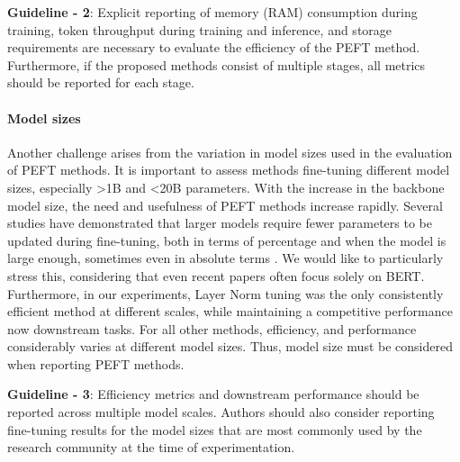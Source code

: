\begin{tcolorbox}[
    colback=gray!05,  
    colframe=black!50, boxrule=0.5pt, arc=3mm,           
    width=\linewidth,  
    leftrule=0.1mm, rightrule=0.1mm, bottomrule=0.1mm, toprule=0.1mm, ]
\textbf{Guideline - 2}: Explicit reporting of memory (RAM) consumption during training, token throughput during training and inference, and storage requirements are necessary to evaluate the efficiency of the PEFT method. Furthermore, if the proposed methods consist of multiple stages, all metrics should be reported for each stage. 
\end{tcolorbox}

\paragraph{Model sizes} Another challenge arises from the variation in model sizes used in the evaluation of PEFT methods. It is important to assess methods fine-tuning different model sizes, especially \textgreater1B and \textless20B parameters. With the increase in the backbone model size, the need and usefulness of PEFT methods increase rapidly. Several studies \citep{intrinsic_said,lora} have demonstrated that larger models require fewer parameters to be updated during fine-tuning, both in terms of percentage and when the model is large enough, sometimes even in absolute terms \citep{prefix_tuning}. We would like to particularly stress this, considering that even recent papers often focus solely on BERT. Furthermore, in our experiments, Layer Norm tuning \citep{layer_norm_tuning} was the only consistently efficient method at different scales, while maintaining a competitive performance now downstream tasks. For all other methods, efficiency, and performance considerably varies at different model sizes. Thus, model size must be considered when reporting PEFT methods.

\begin{tcolorbox}[
    colback=gray!05,  
    colframe=black!50, boxrule=0.5pt, arc=3mm,           
    width=\linewidth,  
    leftrule=0.1mm, rightrule=0.1mm, bottomrule=0.1mm, toprule=0.1mm, ]
\textbf{Guideline - 3}: Efficiency metrics and downstream performance should be reported across multiple model scales. Authors should also consider reporting fine-tuning results for the model sizes that are most commonly used by the research community at the time of experimentation.
\end{tcolorbox}

